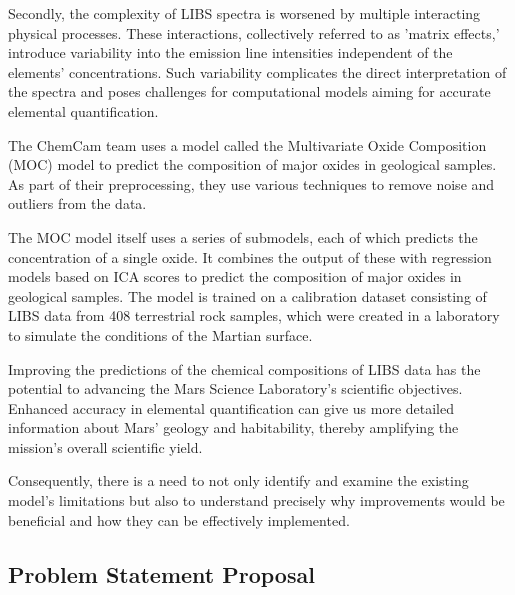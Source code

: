 Secondly, the complexity of LIBS spectra is worsened by multiple interacting physical processes.
These interactions, collectively referred to as 'matrix effects,' introduce variability into the emission line intensities independent of the elements' concentrations.
Such variability complicates the direct interpretation of the spectra and poses challenges for computational models aiming for accurate elemental quantification.\cite{andersonImprovedAccuracyQuantitative2017}

The ChemCam team uses a model called the Multivariate Oxide Composition (MOC) model to predict the composition of major oxides in geological samples. As part of their preprocessing, they use various techniques to remove noise and outliers from the data.\cite{cleggRecalibrationMarsScience2017}

The MOC model itself uses a series of submodels, each of which predicts the concentration of a single oxide. It combines the output of these with regression models based on ICA scores to predict the composition of major oxides in geological samples.
The model is trained on a calibration dataset consisting of LIBS data from 408 terrestrial rock samples, which were created in a laboratory to simulate the conditions of the Martian surface.\cite{cleggRecalibrationMarsScience2017}

Improving the predictions of the chemical compositions of LIBS data has the potential to advancing the Mars Science Laboratory's scientific objectives.
Enhanced accuracy in elemental quantification can give us more detailed information about Mars' geology and habitability, thereby amplifying the mission's overall scientific yield. 

Consequently, there is a need to not only identify and examine the existing model's limitations but also to understand precisely why improvements would be beneficial and how they can be effectively implemented.

\subsection{Problem Statement Proposal}

